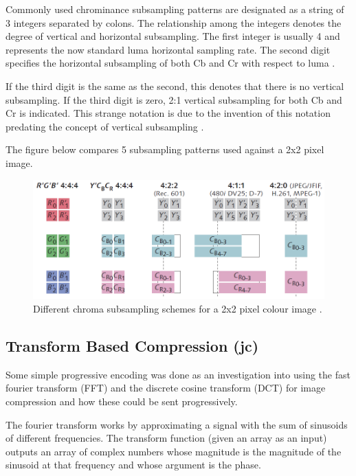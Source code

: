 Commonly used chrominance subsampling patterns are designated as 
a string of 3 integers separated by colons. 
The relationship among the integers denotes 
the degree of vertical and horizontal subsampling.
The first integer is usually 4 and represents the 
now standard luma horizontal sampling rate. 
The second digit specifies the horizontal subsampling of 
both Cb and Cr with respect to luma \cite{poynton_chroma_subsampling}.

If the third digit is the same as the second,
this denotes that there is no vertical subsampling.
If the third digit is zero, 2:1 vertical subsampling
for both Cb and Cr is indicated. This strange notation
is due to the invention of this notation
predating the concept of vertical subsampling \cite{poynton_chroma_subsampling}.

The figure below compares 5 subsampling patterns used against a 2x2 pixel image.

\begin{figure}[!hbtp]
\begin{center}
\includegraphics[scale=0.5]{figures/chromasub.png} 
\end{center}
\caption{Different chroma subsampling schemes for a 2x2 pixel colour image \cite{poynton_chroma_subsampling}. \label{chroma_examples}}
\end{figure}

\subsection{Transform Based Compression (jc)}
\label{transfom_based}

Some simple progressive encoding was done as an investigation into using the fast fourier transform (FFT) and the discrete cosine transform (DCT) for image compression and how these could be sent progressively.

The fourier transform works by approximating a signal with the sum of sinusoids of different frequencies. The transform function (given an array as an input) outputs an array of complex numbers whose magnitude is the magnitude of the sinusoid at that frequency and whose argument is the phase.


